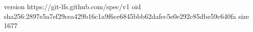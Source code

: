 version https://git-lfs.github.com/spec/v1
oid sha256:2897e5a7ef29cea429b16c1a9f6ce6845bbb62dafec5e0e292c85dbe59c640fa
size 1677
